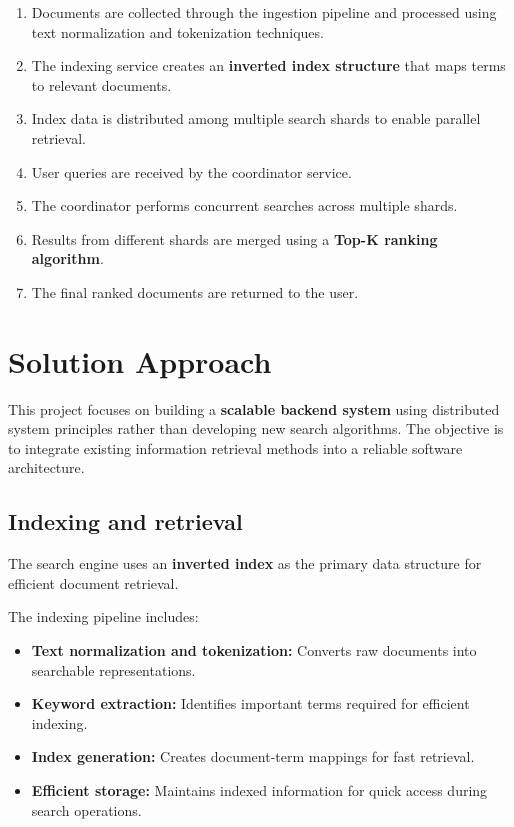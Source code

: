 \documentclass[11pt]{article}
\begin{document}
\begin{enumerate}

\item Documents are collected through the ingestion pipeline and processed using text normalization and tokenization techniques.

\item The indexing service creates an \textbf{inverted index structure} that maps terms to relevant documents.

\item Index data is distributed among multiple search shards to enable parallel retrieval.

\item User queries are received by the coordinator service.

\item The coordinator performs concurrent searches across multiple shards.

\item Results from different shards are merged using a \textbf{Top-K ranking algorithm}.

\item The final ranked documents are returned to the user.

\end{enumerate}


\section{Solution Approach}

This project focuses on building a \textbf{scalable backend system} using distributed system principles rather than developing new search algorithms. The objective is to integrate existing information retrieval methods into a reliable software architecture.


\subsection{Indexing and retrieval}

The search engine uses an \textbf{inverted index} as the primary data structure for efficient document retrieval.

The indexing pipeline includes:

\begin{itemize}

\item \textbf{Text normalization and tokenization:} Converts raw documents into searchable representations.

\item \textbf{Keyword extraction:} Identifies important terms required for efficient indexing.

\item \textbf{Index generation:} Creates document-term mappings for fast retrieval.

\item \textbf{Efficient storage:} Maintains indexed information for quick access during search operations.

\end{itemize}
\end{document}
